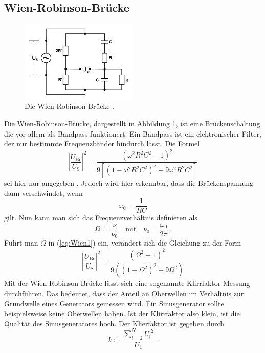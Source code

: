 \subsection{Wien-Robinson-Brücke}

\begin{figure}
    \centering
    \includegraphics[width=0.5\textwidth]{pictures/schaltung6.pdf}
    \caption{Die Wien-Robinson-Brücke \cite[8]{v302}.}
    \label{fig:Schaltung6}
\end{figure}

Die Wien-Robinson-Brücke, dargestellt in Abbildung \ref{fig:Schaltung6}, ist eine Brückenschaltung
die vor allem als Bandpass funktionert. 
Ein Bandpass ist ein elektronischer Filter, der  nur bestimmte Frequenzbänder hindurch lässt.
Die Formel
\begin{equation} \label{eq:Wien1}
    \left|\frac{U_\text{Br}}{U_\text{S}}\right|^2 =  \frac{\left({\omega}^2 R^2 C^2 -1 \right)^2}
    {9 \left[ \left( 1 - {\omega}^2 R^2 C^2 \right)^2 + 9 {\omega}^2 R^2 C^2 \right]}
\end{equation}
sei hier nur angegeben \cite[9]{v302}.
Jedoch wird hier erkennbar, dass die Brückenspannung dann verschwindet, wenn
\begin{equation*}
    \omega_0 = \frac{1}{R C}
\end{equation*}
gilt. Nun kann man sich das Frequenzverhältnis definieren als
\begin{equation*}
    \Omega \coloneq \frac{\nu}{\nu_0} \quad \text{mit} \quad \nu_0 = \frac{\omega_0}{2\pi} \, .
\end{equation*}
Führt man $\Omega$ in (\ref{eq:Wien1}) ein, verändert sich die Gleichung zu der Form
\begin{equation} \label{eq:Wien2}
    \left|\frac{U_\text{Br}}{U_\text{S}}\right|^2 = \frac{\left( \Omega^2 -1 \right)^2}
    {9 \left( \left( 1 - \Omega^2 \right)^2 + 9 \Omega^2 \right)}
\end{equation}
Mit der Wien-Robinson-Brücke lässt sich eine sogenannte Klirrfaktor-Messung durchführen.
Das bedeutet, dass der Anteil an Oberwellen im Verhältnis zur Grundwelle eines Generators gemessen wird.
Ein Sinusgenerator sollte beispielsweise keine Oberwellen haben.
Ist der Klirrfaktor also klein, ist die Qualität des Sinusgeneratores hoch.
Der Klierfaktor ist gegeben durch
\begin{equation} \label{eq:klirr}
    k \coloneq \frac {\sum_{i=2}^{N} {U_i}^2}{U_1}  \, .
\end{equation}